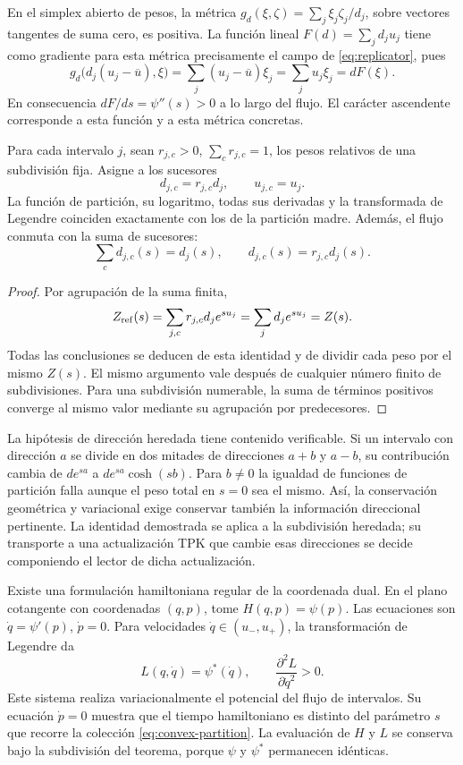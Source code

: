 En el simplex abierto de pesos, la métrica
\(g_d(\xi,\zeta)=\sum_j\xi_j\zeta_j/d_j\), sobre vectores tangentes
de suma cero, es positiva. La función lineal
\(F(d)=\sum_jd_ju_j\) tiene como gradiente para esta métrica
precisamente el campo de \eqref{eq:replicator}, pues
\[
 g_d\bigl(d_j(u_j-\overline u),\xi\bigr)
 =\sum_j(u_j-\overline u)\xi_j=\sum_ju_j\xi_j=dF(\xi).
\]
En consecuencia \(dF/ds=\psi''(s)>0\) a lo largo del flujo. El
carácter ascendente corresponde a esta función y a esta métrica concretas.

\begin{theorem}
Para cada intervalo \(j\), sean \(r_{j,c}>0\),
\(\sum_c r_{j,c}=1\), los pesos relativos de una subdivisión fija.
Asigne a los sucesores
\[
 d_{j,c}=r_{j,c}d_j,\qquad u_{j,c}=u_j.
\]
La función de partición, su logaritmo, todas sus derivadas y la transformada
de Legendre coinciden exactamente con los de la partición madre.
Además, el flujo conmuta con la suma de sucesores:
\[
 \sum_c d_{j,c}(s)=d_j(s),\qquad
 d_{j,c}(s)=r_{j,c}d_j(s).
\]
\end{theorem}
\begin{proof}
Por agrupación de la suma finita,
\[
 Z_{\rm ref}(s)=\sum_{j,c}r_{j,c}d_j e^{su_j}
 =\sum_j d_j e^{su_j}=Z(s).
\]
Todas las conclusiones se deducen de esta identidad y de dividir cada
peso por el mismo \(Z(s)\). El mismo argumento vale después de cualquier
número finito de subdivisiones. Para una subdivisión numerable, la suma de
términos positivos converge al mismo valor mediante su agrupación por predecesores.
\end{proof}

La hipótesis de dirección heredada tiene contenido verificable. Si un
intervalo con dirección \(a\) se divide en dos mitades de direcciones
\(a+b\) y \(a-b\), su contribución cambia de
\(d e^{sa}\) a \(d e^{sa}\cosh(sb)\). Para \(b\ne0\) la igualdad
de funciones de partición falla aunque el peso total en \(s=0\) sea
el mismo. Así, la conservación geométrica y variacional exige conservar
también la información direccional pertinente. La identidad demostrada
se aplica a la subdivisión heredada; su transporte a una actualización
TPK que cambie esas direcciones se decide componiendo el lector de dicha
actualización.

Existe una formulación hamiltoniana regular de la coordenada dual. En el
plano cotangente con coordenadas \((q,p)\), tome
\(H(q,p)=\psi(p)\). Las ecuaciones son
\(\dot q=\psi'(p)\), \(\dot p=0\). Para velocidades
\(\dot q\in(u_-,u_+)\), la transformación de Legendre da
\[
 L(q,\dot q)=\psi^*(\dot q),\qquad
 \frac{\partial^2L}{\partial\dot q^2}>0.
\]
Este sistema realiza variacionalmente el potencial del flujo de intervalos.
Su ecuación \(\dot p=0\) muestra que el tiempo hamiltoniano es distinto
del parámetro \(s\) que recorre la colección \eqref{eq:convex-partition}.
La evaluación de \(H\) y \(L\) se conserva bajo la subdivisión del
teorema, porque \(\psi\) y \(\psi^*\) permanecen idénticas.

